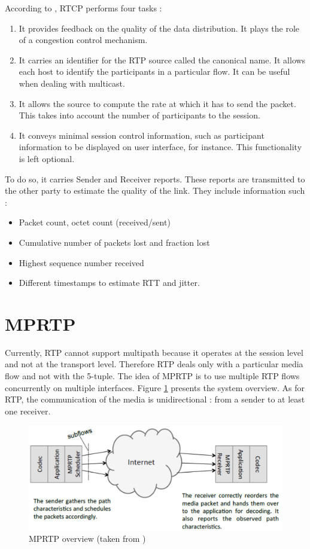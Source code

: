 According to \cite{javvin2005network}, RTCP performs four tasks : 

\begin{enumerate}
\item It provides feedback on the quality of the data distribution. It plays the role of a congestion control mechanism.
\item It carries an identifier for the RTP source called the canonical name. It allows each host to identify the participants in a particular flow. It can be useful when dealing with multicast.
\item It allows the source to compute the rate at which it has to send the packet. This takes into account the number of participants to the session.
\item It conveys minimal session control information, such as participant information to be displayed on user interface, for instance. This functionality is left optional.
\end{enumerate}

To do so, it carries Sender and Receiver reports. These reports are transmitted to the other party to estimate the quality of the link. They include information such :

\begin{itemize}
\item Packet count, octet count (received/sent)
\item Cumulative number of packets lost and fraction lost
\item Highest sequence number received
\item Different timestamps to estimate RTT and jitter.
\end{itemize}


\section{MPRTP}

Currently, RTP cannot support multipath because it operates at the session level and not at the transport level. Therefore RTP deals only with a particular media flow and not with the 5-tuple. The idea of MPRTP is to use multiple RTP flows concurrently on multiple interfaces. Figure \ref{fig:mprtp-concept} presents the system overview. As for RTP, the communication of the media is unidirectional : from a sender to at least one receiver. 


\begin{figure}
\centering
\includegraphics[width=0.9\linewidth]{images/mprtp}
\caption[MPRTP overview]{MPRTP overview (taken from \cite{singh2013mprtp})}
\label{fig:mprtp-concept}
\end{figure}

